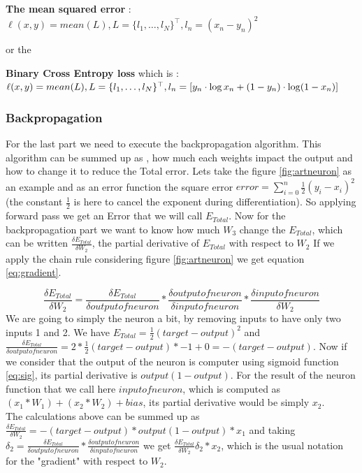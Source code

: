 \textbf{The mean squared error} :  $\ell(x, y) = mean(L), L = \{l_1,\dots,l_N\}^\top,  l_n = \left( x_n - y_n \right)^2 $

or the 


\textbf{Binary Cross Entropy loss } which is : $\ell(x, y) = mean(L) , L = \{l_1,\dots,l_N\}^\top, \\ l_n = \left[ y_n \cdot \log x_n + (1 - y_n) \cdot \log (1 - x_n) \right]$


\subsubsection{Backpropagation}

For the last part we need to execute the backpropagation algorithm. This algorithm can be summed up as , how much each weights impact the output and how to change it to reduce the Total error. Lets take the figure \ref{fig:artneuron} as an example and as an error function the square error $error = \sum\limits_{i=0}^n \frac{1}{2} (y_i - x_i)^2$ (the constant $\frac{1}{2}$ is here to cancel the exponent during differentiation). So applying forward pass we get an Error that we will call $E_{Total}$. Now for the backpropagation part we want to know how much $W_3$ change the $E_{Total}$, which can be written $\frac{ \delta E_{Total}}{\delta W_2}$, the partial derivative of $E_{Total}$ with respect to $W_2$ If we apply the chain rule considering figure \ref{fig:artneuron} we get equation \ref{eq:gradient}.

\begin{equation}
    \frac{ \delta E_{Total}}{\delta W_2} = \frac{ \delta E_{Total}}{\delta outputofneuron}  * \frac{ \delta outputofneuron}{\delta inputofneuron} * \frac{ \delta inputofneuron}{\delta W_2}
    \label{eq:gradient}
\end{equation}
We are going to simply the neuron a bit, by removing inputs to have only two inputs 1 and 2. We have $ E_{Total} = \frac{1}{2} (target - output)^2$ and $\frac{ \delta E_{Total}}{\delta outputofneuron} = 2 * \frac{1}{2} (target - output) * -1 + 0 = -(target - output)  $. Now if we consider that the output of the neuron is computer using sigmoid function \ref{eq:sig}, its partial derivative is $ output ( 1 - output)$. For the result of the neuron function that we call here $inputofneuron$, which is computed as  $ (x_1 * W_1) + (x_2 * W_2) + bias$, its partial derivative would be simply $ x_2$.\\

The calculations above can be summed up as $\frac{ \delta E_{Total}}{\delta W_2} = -(target- output) * output ( 1- output) * x_1 $ and taking $ \delta_2 = \frac{ \delta E_{Total}}{\delta outputofneuron}  * \frac{ \delta outputofneuron}{\delta inputofneuron}$ we get  $  \frac{ \delta E_{Total}}{\delta W_2} \delta_2 * x_2$, which is the usual notation for the "gradient" with respect to $W_2$.\\


